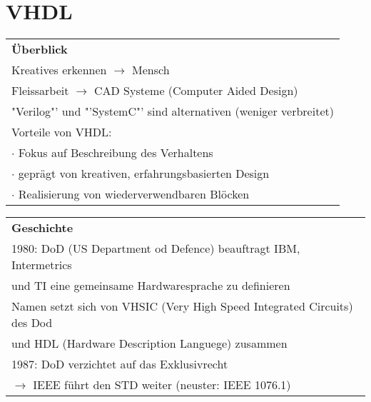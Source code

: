 \section{VHDL}

\begin{minipage}{0.45\textwidth}
	\begin{tabular}{l}
		\textbf{Überblick}\\
		Kreatives erkennen $\rightarrow$ Mensch\\
		Fleissarbeit $\rightarrow$ CAD Systeme {\tiny (Computer Aided Design)}\\
		"Verilog"' und "'SystemC"' sind alternativen {\tiny (weniger verbreitet)}\\
		Vorteile von VHDL:\\
		\quad $\cdot$ Fokus auf Beschreibung des Verhaltens \\
		\quad $\cdot$ geprägt von kreativen, erfahrungsbasierten Design \\
		\quad $\cdot$ Realisierung von wiederverwendbaren Blöcken \\
	\end{tabular}
\end{minipage}
\begin{minipage}{0.5\textwidth}
	\begin{tabular}{l}
		\textbf{Geschichte}\\
		1980: DoD {\tiny (US Department od Defence)} beauftragt IBM, Intermetrics \\
		\quad und TI eine gemeinsame Hardwaresprache zu definieren\\
		Namen setzt sich von VHSIC {\tiny (Very High Speed Integrated Circuits)} des Dod\\
		\quad und HDL {\tiny (Hardware Description Languege)} zusammen \\
		1987: DoD verzichtet auf das Exklusivrecht \\
		\quad $\rightarrow$ IEEE führt den STD weiter {\tiny (neuster: IEEE 1076.1)} \\
	\end{tabular}
\end{minipage}

